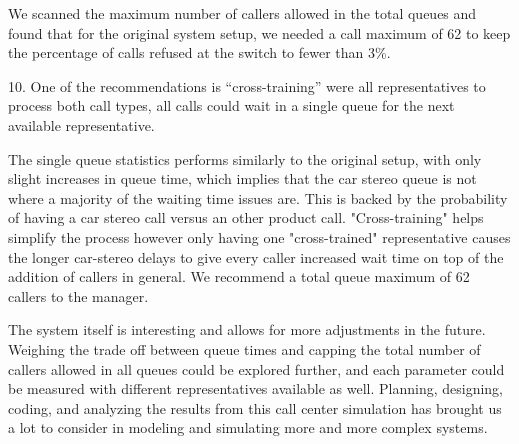 \documentclass{article}
\begin{document}
We scanned the maximum number of callers allowed in the total queues and found that for the original system setup, we needed a call maximum of 62 to keep the percentage of calls refused at the switch to fewer than 3\%.
\par
10. One of the recommendations is “cross-training” were all representatives to process both call types, all calls could wait in a single queue for the next available representative.
\par
The single queue statistics performs similarly to the original setup, with only slight increases in queue time, which implies that the car stereo queue is not where a majority of the waiting time issues are. This is backed by the probability of having a car stereo call versus an other product call. "Cross-training" helps simplify the process however only having one "cross-trained" representative causes the longer car-stereo delays to give every caller increased wait time on top of the addition of callers in general. We recommend a total queue maximum of 62 callers to the manager.\\
\par
The system itself is interesting and allows for more adjustments in the future. Weighing the trade off between queue times and capping the total number of callers allowed in all queues could be explored further, and each parameter could be measured with different representatives available as well. Planning, designing, coding, and analyzing the results from this call center simulation has brought us a lot to consider in modeling and simulating more and more complex systems.
\end{document}

